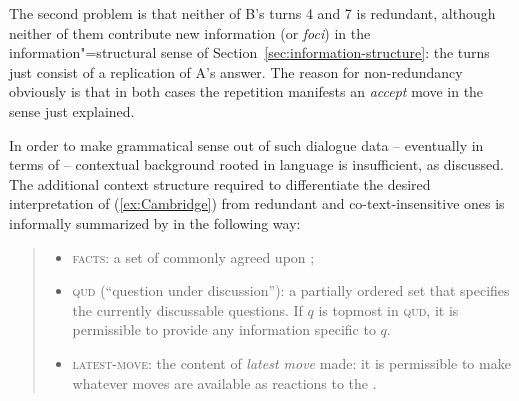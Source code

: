 \documentclass[output=paper
 	        ,biblatex
                ,babelshorthands
                ,newtxmath
                ,draftmode
                ,colorlinks, citecolor=brown
]{langscibook}
\begin{document}
The second problem is that neither of B's turns 4 and 7 is redundant, although neither of them contribute new information (or \emph{foci}) in the information"=structural sense of Section~\ref{sec:information-structure}: the turns just consist of a replication of A's answer.
%
The reason for non-redundancy obviously is that in both cases the repetition manifests an \emph{accept} move in the sense just explained.


In order to make grammatical sense out of such dialogue data -- eventually in terms of  -- contextual background rooted in language is insufficient, as discussed.
%
The additional context structure required to differentiate the desired interpretation of (\ref{ex:Cambridge}) from redundant and co-text-insensitive ones is informally summarized by \citet[]{Ginzburg:1994} in the following way:
%
\begin{quote}
  \begin{itemize}
  \item \textsc{facts}: a set of commonly agreed upon ;
  \item \textsc{qud} (\enquote{question under discussion}): a partially ordered set that specifies the currently discussable questions. If $q$ is topmost in \textsc{qud}, it is permissible to provide any information specific to $q$.
  \item \textsc{latest-move}: the content of \emph{latest move} made: it is permissible to make whatever moves are available as reactions to the .
  \end{itemize}
\end{quote}
\end{document}
